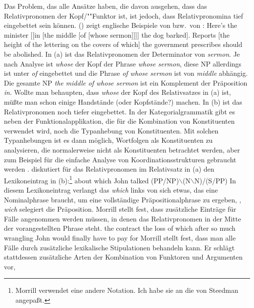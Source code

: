 Das Problem, das alle Ansätze haben, die davon ausgehen, dass das Relativpronomen der
Kopf/""Funktor ist, ist jedoch, dass Relativpronomina tief eingebettet sein können.
() zeigt englische Beispiele von \citet[]{ps2} bzw.\ von \citet[]{Ross67}\nocite{Ross86a-u}:
\eal
\ex Here's the minister [[in [the middle [of [whose sermon]]]] the dog barked].
\ex Reports [the height of the lettering on the covers of which] the government prescribes should be abolished.
\zl
In (a) ist das Relativpronomen der Determinator von \emph{sermon}.
Je nach Analyse ist \emph{whose} der Kopf der Phrase \emph{whose sermon},
diese NP allerdings ist unter \emph{of} eingebettet und die Phrase \emph{of whose sermon}
ist von \emph{middle} abhängig. Die gesamte NP \emph{the middle of whose sermon}
ist ein Komplement der Präposition \emph{in}. Wollte man behaupten, dass \emph{whose}
der Kopf des Relativsatzes in (a) ist, müßte man schon einige Handstände (oder Kopfstände?)
machen. In (b) ist das Relativpronomen noch tiefer eingebettet.
In der Kategorialgrammatik gibt es neben der Funktionalapplikation, die
für die Kombination von Konstituenten verwendet wird, noch die Typanhebung von
Konstituenten. Mit solchen Typanhebungen ist es dann möglich, Wortfolgen als
Konstituenten zu analysieren, die normalerweise nicht als Konstituenten betrachtet
werden, aber zum Beispiel für die einfache Analyse von Koordinationsstrukturen
gebraucht werden \citep{Steedman89a}. \citet[]{Morrill95a} diskutiert für das
Relativpronomen im Relativsatz in (a) den Lexikoneintrag in (b):\footnote{
  Morrill verwendet eine andere Notation. Ich habe sie an die von Steedman angepaßt.
}
\eal
\ex about which John talked
\ex (PP/NP)$\backslash$(N$\backslash$N)/(S/PP)
\zl
In diesem Lexikoneintrag verlangt das \emph{which} links von sich etwas, das eine Nominalphrase
braucht, um eine vollständige Präpositionalphrase zu ergeben, \dash, \emph{wich} selegiert die
Präposition. Morrill stellt fest, dass zusätzliche Einträge für Fälle angenommen werden müssen, in
denen das Relativpronomen in der Mitte der vorangestellten Phrase steht.
\ea
the contract the loss of which after so much wrangling John would finally have to pay for
\z
Morrill stellt fest, dass man alle Fälle durch zusätzliche lexikalische Stipulationen behandeln
kann. Er schlägt stattdessen zusätzliche Arten der Kombination von Funktoren und Argumenten vor,
